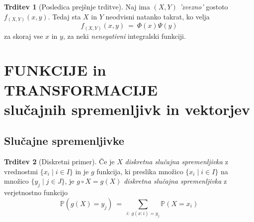 \documentclass[11pt]{article}
\newcommand{\p}{\mathbb{P}}
\newcommand{\1}{\mathbbm{1}}
\theoremstyle{definition}
\theoremstyle{definition}
\newtheorem{trditev}{Trditev}[section]
\theoremstyle{definition}
\begin{document}
\begin{trditev}[Posledica prejšnje trditve]

Naj ima $(X, Y)$ \textit{'zvezno'} gostoto $f_{(X, Y)}(x, y)$. Tedaj sta $X$ in $Y$ neodvisni natanko takrat, ko velja
$$f_{(X, Y)}(x, y) ~=~ \Phi(x) \Psi(y)$$
za skoraj vse $x$ in $y$, za neki \textit{nenegativni} integralski funkciji.

\end{trditev}
\vspace{0.5cm}

\pagebreak


\section{FUNKCIJE in TRANSFORMACIJE \\slučajnih spremenljivk in vektorjev}
\vspace{0.5cm}


\subsection{Slučajne spremenljivke}
\vspace{0.5cm}

\begin{trditev}[Diskretni primer]

Če je $X$ \textit{diskretna slučajna spremenljivka} z vrednostmi $\{ x_i \mid i \in I \}$ in je $g$ funkcija, ki preslika množico $\{ x_i \mid i \in I \}$ na množico $\{ y_j \mid j \in J \}$, je $g \circ X = g(X)$ \textit{diskretna slučajna spremenljivka} z verjetnostno funkcijo
$$\p(g(X) = y_j) ~=~ \sum_{i:~g(x:i)=y_j} \p(X = x_i)$$

\end{trditev}
\vspace{0.5cm}
\end{document}
